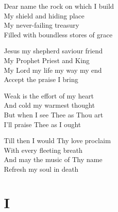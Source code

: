 \documentclass{beamer}
\begin{document}
{\begin{frame}{}
\end{frame}

\hypertarget{How sweet the name of Jesus sounds[]3}{}
\begin{frame}{}
\fontsize{ 18 }{ 23 }\selectfont

Dear name the rock on which I build\\ 
My shield and hiding place\\ 
My never-failing treasury\\ 
Filled with boundless stores of grace 

\end{frame}

\hypertarget{How sweet the name of Jesus sounds[]4}{}
\begin{frame}{}
\fontsize{ 18 }{ 23 }\selectfont

Jesus my shepherd saviour friend\\ 
My Prophet Priest and King\\ 
My Lord my life my way my end\\ 
Accept the praise I bring 

\end{frame}

\hypertarget{How sweet the name of Jesus sounds[]5}{}
\begin{frame}{}
\fontsize{ 18 }{ 23 }\selectfont

Weak is the effort of my heart\\ 
And cold my warmest thought\\ 
But when I see Thee as Thou art\\ 
I'll praise Thee as I ought 

\end{frame}

\hypertarget{How sweet the name of Jesus sounds[]6}{}
\begin{frame}{}
\fontsize{ 18 }{ 23 }\selectfont

Till then I would Thy love proclaim\\ 
With every fleeting breath\\ 
And may the music of Thy name\\ 
Refresh my soul in death 

\end{frame}

}
 
\section{I}
\end{document}
